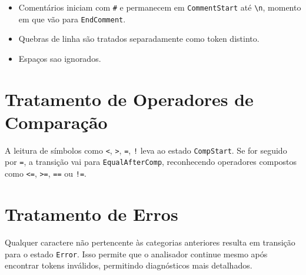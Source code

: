 \documentclass[a4paper,12pt]{article}
\begin{document}
\begin{itemize}
    \item Comentários iniciam com \texttt{\#} e permanecem em \texttt{CommentStart} até \texttt{\textbackslash n}, momento em que vão para \texttt{EndComment}.
    \item Quebras de linha são tratados separadamente como token distinto.
    \item Espaços sao ignorados.
\end{itemize}

\section*{Tratamento de Operadores de Comparação}

A leitura de símbolos como \texttt{<}, \texttt{>}, \texttt{=}, \texttt{!} leva ao estado \texttt{CompStart}. Se for seguido por \texttt{=}, a transição vai para \texttt{EqualAfterComp}, reconhecendo operadores compostos como \texttt{<=}, \texttt{>=}, \texttt{==} ou \texttt{!=}.

\section*{Tratamento de Erros}

Qualquer caractere não pertencente às categorias anteriores resulta em transição para o estado \texttt{Error}. Isso permite que o analisador continue mesmo após encontrar tokens inválidos, permitindo diagnósticos mais detalhados.
\end{document}
